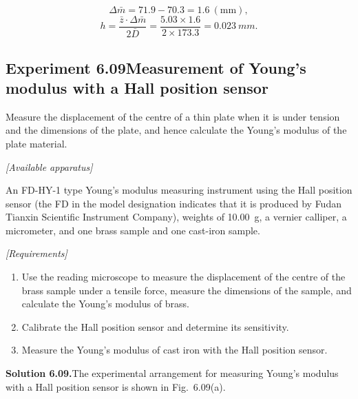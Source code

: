 \noindent
\begin{equation*}
\Delta\bar m=71.9-70.3=1.6\ (\mathrm{mm}),
\end{equation*}
\begin{equation*}
h=\frac{\bar z\cdot\Delta\bar m}{2\bar D}=\frac{5.03\times1.6}{2\times173.3}=\SI{0.023}{mm}.
\end{equation*}

\subsection*{Experiment 6.09\quad Measurement of Young's modulus with a Hall position sensor}

Measure the displacement of the centre of a thin plate when it is under tension and the dimensions of the plate, and hence calculate the Young's modulus of the plate material.

\noindent\textit{[Available apparatus]}

An FD-HY-1 type Young's modulus measuring instrument using the Hall position sensor (the FD in the model designation indicates that it is produced by Fudan Tianxin Scientific Instrument Company), weights of \SI{10.00}{g}, a vernier calliper, a micrometer, and one brass sample and one cast-iron sample.

\noindent\textit{[Requirements]}
\begin{enumerate}[label=(\arabic*),leftmargin=2.2em,itemsep=1pt,topsep=2pt]
\item Use the reading microscope to measure the displacement of the centre of the brass sample under a tensile force, measure the dimensions of the sample, and calculate the Young's modulus of brass.
\item Calibrate the Hall position sensor and determine its sensitivity.
\item Measure the Young's modulus of cast iron with the Hall position sensor.
\end{enumerate}

\medskip
\noindent\textbf{Solution 6.09.}\quad The experimental arrangement for measuring Young's modulus with a Hall position sensor is shown in Fig.~6.09(a).

